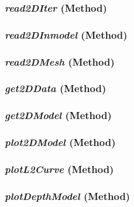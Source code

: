 \subsubsection{\textit{read2DIter} (Method)}
\label{sssec:.modeling.occamtools.Occam2DModel.read2DIter}



\subsubsection{\textit{read2DInmodel} (Method)}
\label{sssec:.modeling.occamtools.Occam2DModel.read2DInmodel}



\subsubsection{\textit{read2DMesh} (Method)}
\label{sssec:.modeling.occamtools.Occam2DModel.read2DMesh}



\subsubsection{\textit{get2DData} (Method)}
\label{sssec:.modeling.occamtools.Occam2DModel.get2DData}



\subsubsection{\textit{get2DModel} (Method)}
\label{sssec:.modeling.occamtools.Occam2DModel.get2DModel}



\subsubsection{\textit{plot2DModel} (Method)}
\label{sssec:.modeling.occamtools.Occam2DModel.plot2DModel}



\subsubsection{\textit{plotL2Curve} (Method)}
\label{sssec:.modeling.occamtools.Occam2DModel.plotL2Curve}



\subsubsection{\textit{plotDepthModel} (Method)}
\label{sssec:.modeling.occamtools.Occam2DModel.plotDepthModel}



